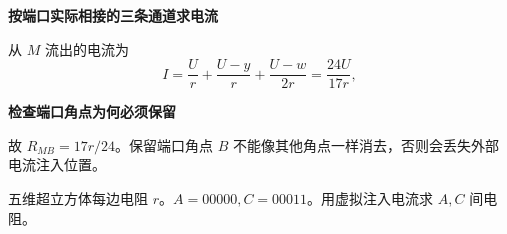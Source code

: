\begin{solution}
\par\medskip{}\noindent\textbf{按端口实际相接的三条通道求电流}\par\nobreak
从 $M$ 流出的电流为
\[
 I=\frac Ur+\frac{U-y}{r}+\frac{U-w}{2r}
 =\frac{24U}{17r},
\]


\par\medskip{}\noindent\textbf{检查端口角点为何必须保留}\par\nobreak
故 $R_{MB}=17r/24$。保留端口角点 $B$ 不能像其他角点一样消去，否则会丢失外部电流注入位置。\end{solution}
\begin{question}\begin{example}[五维网络中相距两步的端口]\label{c3:example:16}
五维超立方体每边电阻 $r$。$A=00000,C=00011$。用虚拟注入电流求 $A,C$ 间电阻。
\end{example}
\end{question}

